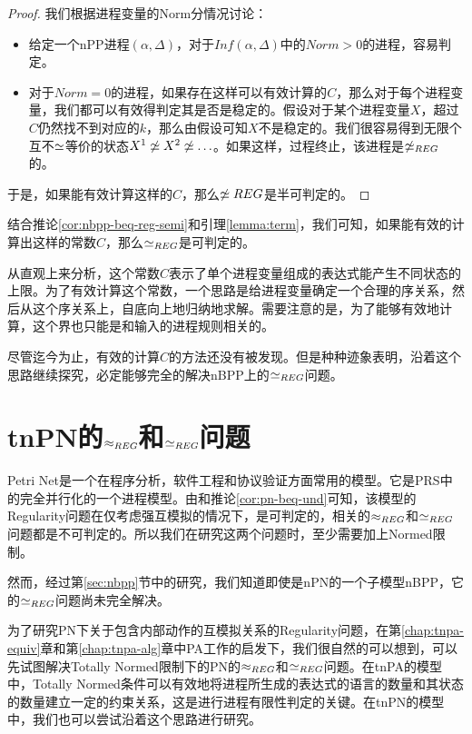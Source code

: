 \begin{proof}
我们根据进程变量的Norm分情况讨论：
\begin{itemize}
\item 给定一个nPP进程$(\alpha,\Delta)$，对于$Inf(\alpha,\Delta)$中的$Norm>0$的进程，容易判定。
\item 对于$Norm=0$的进程，如果存在这样可以有效计算的$C$，那么对于每个进程变量，我们都可以有效得判定其是否是稳定的。假设对于某个进程变量$X$，超过$C$仍然找不到对应的$k$，那么由假设可知$X$不是稳定的。我们很容易得到无限个互不$\simeq$等价的状态$X^1\not\simeq X^2\not\simeq\ldots$。如果这样，过程终止，该进程是$\not\simeq_{REG}$的。
\end{itemize}
于是，如果能有效计算这样的$C$，那么$\not\simeq{REG}$是半可判定的。
\end{proof}

结合推论\ref{cor:nbpp-beq-reg-semi}和引理\ref{lemma:term}，我们可知，如果能有效的计算出这样的常数$C$，那么$\simeq_{REG}$是可判定的。

从直观上来分析，这个常数$C$表示了单个进程变量组成的表达式能产生不同状态的上限。为了有效计算这个常数，一个思路是给进程变量确定一个合理的序关系，然后从这个序关系上，自底向上地归纳地求解。需要注意的是，为了能够有效地计算，这个界也只能是和输入的进程规则相关的。

尽管迄今为止，有效的计算$C$的方法还没有被发现。但是种种迹象表明，沿着这个思路继续探究，必定能够完全的解决nBPP上的$\simeq_{REG}$问题。

\section{tnPN的$\approx_{REG}$和$\simeq_{REG}$问题}
\label{sec:tnPN}

Petri Net是一个在程序分析，软件工程和协议验证方面常用的模型。它是PRS中的完全并行化的一个进程模型。由\cite{Jancar1996}和推论\ref{cor:pn-beq-und}可知，该模型的Regularity问题在仅考虑强互模拟的情况下，是可判定的，相关的$\approx_{REG}$和$\simeq_{REG}$问题都是不可判定的。所以我们在研究这两个问题时，至少需要加上Normed限制。

然而，经过第\ref{sec:nbpp}节中的研究，我们知道即使是nPN的一个子模型nBPP，它的$\simeq_{REG}$问题尚未完全解决。

为了研究PN下关于包含内部动作的互模拟关系的Regularity问题，在第\ref{chap:tnpa-equiv}章和第\ref{chap:tnpa-alg}章中PA工作的启发下，我们很自然的可以想到，可以先试图解决Totally Normed限制下的PN的$\approx_{REG}$和$\simeq_{REG}$问题。在tnPA的模型中，Totally Normed条件可以有效地将进程所生成的表达式的语言的数量和其状态的数量建立一定的约束关系，这是进行进程有限性判定的关键。在tnPN的模型中，我们也可以尝试沿着这个思路进行研究。

